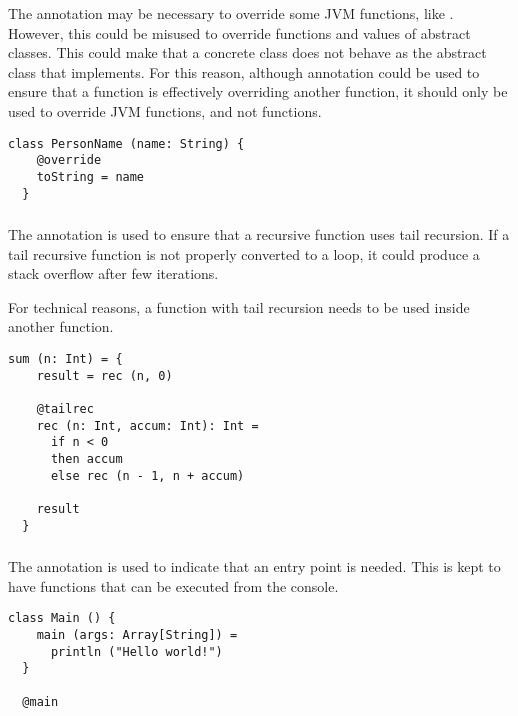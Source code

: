 \documentclass[12pt,a4paper]{book}
\begin{document}
    The \soverride annotation may be necessary to override some JVM functions, like .
    However, this could be misused to override functions and values of abstract classes.
    This could make that a concrete class does not behave as the abstract class that implements.
    For this reason, although \soverride annotation could be used to ensure that a function is effectively overriding another function, it should only be used to override JVM functions, and not \Soda functions.

    \begin{lstlisting}[label={lst:exampleOverride}]
  class PersonName (name: String) {
    @override
    toString = name
  }
    \end{lstlisting}

    \subsubsection{\stailrec}

    The \stailrec annotation is used to ensure that a recursive function uses tail recursion.
    If a tail recursive function is not properly converted to a loop, it could produce a stack overflow after few iterations.

    For technical reasons, a function with tail recursion needs to be used inside another function.

    \begin{lstlisting}[label={lst:exampleTailrecInside}]
  sum (n: Int) = {
    result = rec (n, 0)

    @tailrec
    rec (n: Int, accum: Int): Int =
      if n < 0
      then accum
      else rec (n - 1, n + accum)

    result
  }
    \end{lstlisting}

    \subsubsection{\smain}

    The \smain annotation is used to indicate that an entry point is needed.
    This is kept to have functions that can be executed from the console.

    \begin{lstlisting}[label={lst:exampleMain}]
  class Main () {
    main (args: Array[String]) =
      println ("Hello world!")
  }

  @main
    \end{lstlisting}
\end{document}
